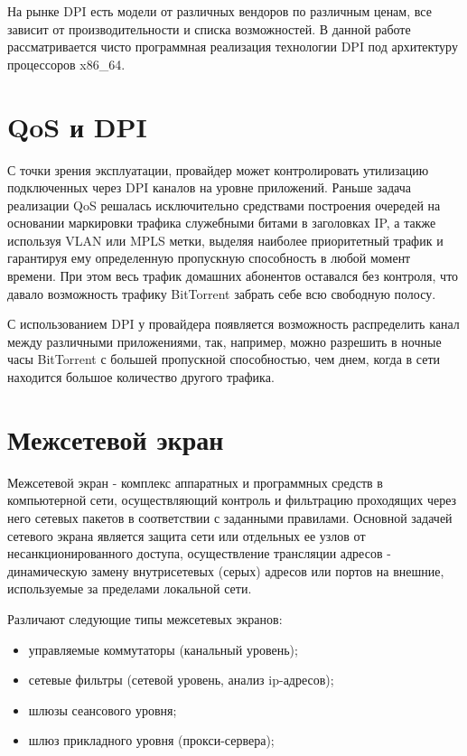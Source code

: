 На рынке DPI есть модели от различных вендоров по различным ценам, все зависит от производительности и списка возможностей. В данной работе рассматривается чисто программная реализация технологии DPI под архитектуру процессоров x86\_64.


\section{QoS и DPI}
С точки зрения эксплуатации, провайдер может контролировать утилизацию подключенных через DPI каналов на уровне приложений. Раньше задача реализации QoS решалась исключительно средствами построения очередей на основании маркировки трафика служебными битами в заголовках IP, а также используя VLAN или MPLS метки, выделяя наиболее приоритетный трафик и гарантируя ему определенную пропускную способность в любой момент времени. При этом весь трафик домашних абонентов оставался без контроля, что давало возможность трафику BitTorrent забрать себе всю свободную полосу.

С использованием DPI у провайдера появляется возможность распределить канал между различными приложениями, так, например, можно разрешить в ночные часы BitTorrent с большей пропускной способностью, чем днем, когда в сети находится большое количество другого трафика.


\section{Межсетевой экран}
Межсетевой экран - комплекс аппаратных и программных средств в компьютерной сети, осуществляющий контроль и фильтрацию проходящих через него сетевых пакетов в соответствии с заданными правилами. Основной задачей сетевого экрана является защита сети или отдельных ее узлов от несанкционированного доступа, осуществление трансляции адресов - динамическую замену внутрисетевых (серых) адресов или портов на внешние, используемые за пределами локальной сети.

Различают следующие типы межсетевых экранов:
\begin{itemize}
\item управляемые коммутаторы (канальный уровень);
\item сетевые фильтры (сетевой уровень, анализ ip-адресов);
\item шлюзы сеансового уровня;
\item шлюз прикладного уровня (прокси-сервера);
\end{itemize}

